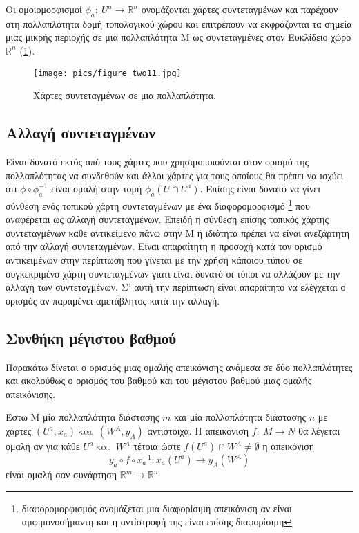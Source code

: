 Οι ομοιομορφισμοί  $\phi_a: ~ U^a \rightarrow \mathbb{R}^n $  ονομάζονται χάρτες συντεταγμένων και παρέχουν στη πολλαπλότητα δομή τοπολογικού χώρου και επιτρέπουν να εκφράζονται τα σημεία μιας μικρής περιοχής σε μια πολλαπλότητα Μ ως συντεταγμένες στον Ευκλίδειο χώρο $\mathbb{R}^n $ (\ref{coorcharts}).

\begin{figure}[H]\centering
	\texttt{[image: pics/figure\_two11.jpg]}
	\caption{Χάρτες συντεταγμένων σε μια πολλαπλότητα.}
	\label{coorcharts}
\end{figure}
\subsection*{Αλλαγή συντεταγμένων }
Είναι δυνατό  εκτός από τους χάρτες που χρησιμοποιούνται στον ορισμό της πολλαπλότητας να συνδεθούν και άλλοι χάρτες  για τους οποίους θα πρέπει να ισχύει ότι $\phi \circ \phi_a^{-1}$ είναι ομαλή στην τομή $\phi_ a (U \cap U^a)$. Επίσης είναι δυνατό να γίνει σύνθεση ενός τοπικού χάρτη συντεταγμένων με ένα διαφορομορφισμό \footnote{διαφορομορφισμός ονομάζεται μια διαφορίσιμη απεικόνιση αν είναι αμφιμονοσήμαντη και η αντίστροφή της είναι επίσης διαφορίσιμη}    που αναφέρεται ως αλλαγή συντεταγμένων. Επειδή η σύνθεση επίσης τοπικός χάρτης συντεταγμένων καθε αντικείμενο πάνω στην Μ ή ιδιότητα πρέπει να είναι ανεξάρτητη από την  αλλαγή συντεταγμένων. Είναι απαραίτητη η προσοχή κατά τον ορισμό αντικειμένων στην περίπτωση που γίνεται με την χρήση κάποιου τύπου σε συγκεκριμένο χάρτη συντεταγμένων γιατι είναι δυνατό οι τύποι να αλλάζουν με την αλλαγή των συντεταγμένων. Σ' αυτή την περίπτωση είναι απαραίτητο να ελέγχεται ο ορισμός αν παραμένει αμετάβλητος κατά την αλλαγή. \\

\subsection*{Συνθήκη μέγιστου βαθμού }
Παρακάτω δίνεται ο ορισμός μιας ομαλής απεικόνισης ανάμεσα σε δύο πολλαπλότητες και ακολούθως ο ορισμός του βαθμού  και του  μέγιστου βαθμού μιας ομαλής απεικόνισης.
\begin{definition}
	Έστω Μ μία πολλαπλότητα διάστασης $m$ και μία πολλαπλότητα διάστασης $n$ με χάρτες $ (U^a,x_a) ~ \text{και } ~ (W^A,y_A ) $ αντίστοιχα. Η  απεικόνιση  $f: ~ M \rightarrow N $ θα λέγεται ομαλή αν για κάθε $ U^a ~\text{και } ~W^A $ τέτοια ώστε  $f(U^a) \cap W^A \neq \emptyset$ η απεικόνιση 
\[ y_a \circ f \circ x_a ^{-1} : x_a(U^a) \rightarrow y_A(W^A) \] είναι ομαλή σαν συνάρτηση $\mathbb{R}^m \rightarrow \mathbb{R}^n$
\end{definition}


